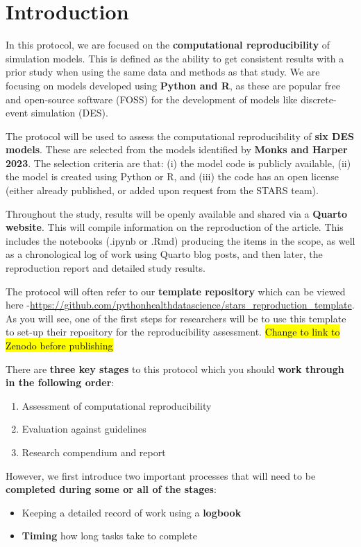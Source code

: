 \section{Introduction}

In this protocol, we are focused on the \textbf{computational reproducibility} of simulation models. This is defined as the ability to get consistent results with a prior study when using  the same data and methods as that study. We are focusing on models developed using \textbf{Python and R}, as these are popular free and open-source software (FOSS) for the development of models like discrete-event simulation (DES).\autocite{monks_computer_2023}

The protocol will be used to assess the computational reproducibility of \textbf{six DES models}. These are selected from the models identified by \textbf{Monks and Harper 2023}.\autocite{monks_computer_2023} The selection criteria are that: (i) the model code is publicly available, (ii) the model is created using Python or R, and (iii) the code has an open license (either already published, or added upon request from the STARS team).

Throughout the study, results will be openly available and shared via a \textbf{Quarto website}. This will compile information on the reproduction of the article. This includes the notebooks (.ipynb or .Rmd) producing the items in the scope, as well as a chronological log of work using Quarto blog posts, and then later, the reproduction report and detailed study results.

The protocol will often refer to our \textbf{template repository} which can be viewed here -\url{https://github.com/pythonhealthdatascience/stars_reproduction_template}. As you will see, one of the first steps for researchers will be to use this template to set-up their repository for the reproducibility assessment. \hl{Change to link to Zenodo before publishing}

There are \textbf{three key stages} to this protocol which you should \textbf{work through in the following order}:
\begin{enumerate}
    \item Assessment of computational reproducibility
    \item Evaluation against guidelines
    \item Research compendium and report
\end{enumerate}

However, we first introduce two important processes that will need to be \textbf{completed during some or all of the stages}:
\begin{itemize}
    \item Keeping a detailed record of work using a \textbf{logbook}
    \item \textbf{Timing} how long tasks take to complete
\end{itemize}


